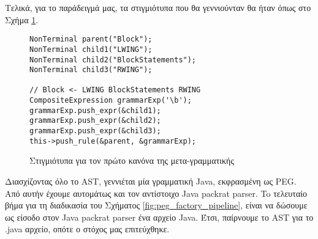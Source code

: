 Τελικά, για το παράδειγμά μας, τα στιγμιότυπα που θα γεννιούνταν θα ήταν όπως στο Σχήμα \ref{fig:objects_seq_example}. 

\begin{figure}[h]
\setlength\partopsep{-\topsep}%
\begin{verbatim}
NonTerminal parent("Block");
NonTerminal child1("LWING");
NonTerminal child2("BlockStatements");
NonTerminal child3("RWING");

// Block <- LWING BlockStatements RWING
CompositeExpression grammarExp('\b');
grammarExp.push_expr(&child1);
grammarExp.push_expr(&child2);
grammarExp.push_expr(&child3);
this->push_rule(&parent, &grammarExp);
\end{verbatim}
\caption{Στιγμιότυπα για τον πρώτο κανόνα της μετα-γραμματικής}
\label{fig:objects_seq_example}
\end{figure}

Διασχίζοντας όλο το AST, γεννιέται μία γραμματική Java, εκφρασμένη ως PEG.
Από αυτήν έχουμε αυτομάτως και τον αντίστοιχο Java packrat parser.
To τελευταίο βήμα για  τη διαδικασία του Σχήματος \ref{fig:peg_factory_pipeline}, είναι να δώσουμε ως είσοδο στον Java packrat parser ένα αρχείο Java.
Έτσι, παίρνουμε το AST για το .java αρχείο, οπότε ο στόχος μας επιτεύχθηκε.

